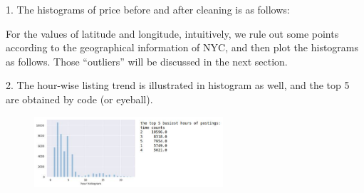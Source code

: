 \documentclass[12pt,twocolumn,letterpaper]{article}
\begin{document}
\-

1. The histograms of price before and after cleaning is as follows:   

\begin{figure}[h!]%
    \centering
    \qquad
    \caption{}%
    \label{fig:example}%
\end{figure}

For the values of latitude and longitude, intuitively, we rule out some points according to the geographical information of NYC, and then plot the histograms as follows. Those “outliers” will be discussed in the next section.

\begin{figure}[h!]%
    \centering
    \qquad
    \caption{}%
    \label{fig:example}%
\end{figure}


2. The hour-wise listing trend is illustrated in histogram as well, and the top 5 are obtained by code (or eyeball).
\\
\begin{figure}[h!]
    \centering
    \includegraphics[width=7cm]{CMPT459_Pair1.png}
    \caption{}
    \label{fig:galaxy}
\end{figure}
\end{document}
